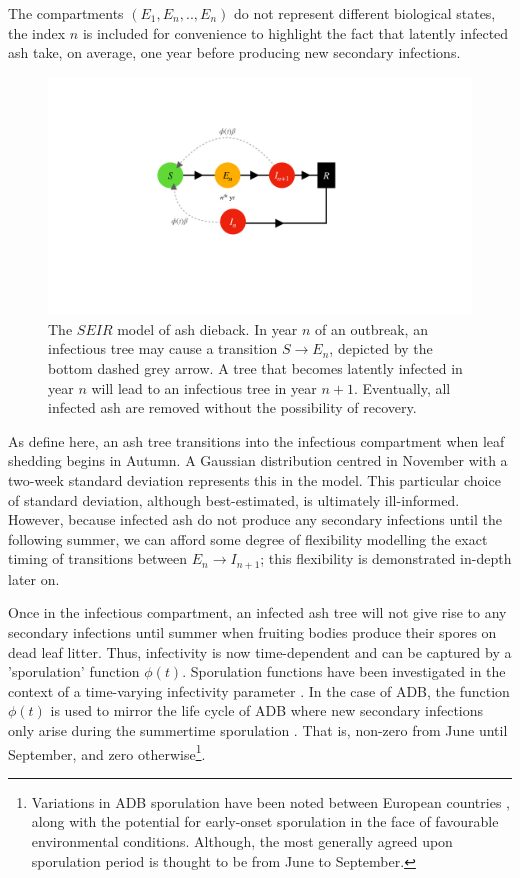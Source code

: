 The compartments $(E_1, E_n,..,E_n)$ do not represent different biological states, the index $n$ is included for convenience to highlight the fact that latently infected ash take, on average, one year before producing new secondary infections.

\begin{figure}
    \centering
    \includegraphics[scale=0.30]{chapter6/figures/fig1.pdf}
    \caption{The $SEIR$ model of ash dieback. In year $n$ of an outbreak, an infectious tree may cause a transition $S\rightarrow E_n$, depicted by the bottom dashed grey arrow. A tree that becomes latently infected in year $n$ will lead to an infectious tree in year $n+1$. Eventually, all infected ash are removed without the possibility of recovery.}
    \label{fig:SEIR-transitions}
\end{figure}

As define here, an ash tree transitions into the infectious compartment when leaf shedding begins in Autumn. A Gaussian distribution centred in November with a two-week standard deviation represents this in the model. This particular choice of standard deviation, although best-estimated, is ultimately ill-informed. However, because infected ash do not produce any secondary infections until the following summer, we can afford some degree of flexibility modelling the exact timing of transitions between $E_{n}\rightarrow I_{n+1}$; this flexibility is demonstrated in-depth later on.

Once in the infectious compartment, an infected ash tree will not give rise to any secondary infections until summer when fruiting bodies produce their spores on dead leaf litter. Thus, infectivity is now time-dependent and can be captured by a 'sporulation' function $\phi(t)$. Sporulation functions have been investigated in the context of a time-varying infectivity parameter \cite{time-varying-infectivity}. In the case of ADB, the function $\phi(t)$ is used to mirror the life cycle of ADB where new secondary infections only arise during the summertime sporulation \cite{https://doi.org/10.1111/mpp.12073}. That is, non-zero from June until September, and zero otherwise\footnote{Variations in ADB sporulation have been noted between European countries \cite{https://doi.org/10.1111/mpp.12073}, along with the potential for early-onset sporulation in the face of favourable environmental conditions. Although, the most generally agreed upon sporulation period is thought to be from June to September.}.

